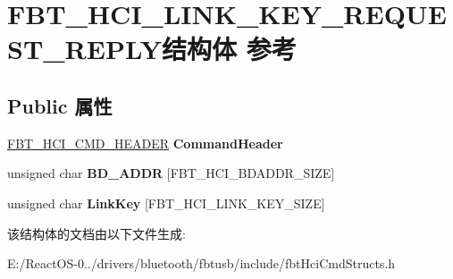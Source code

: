 \hypertarget{struct_f_b_t___h_c_i___l_i_n_k___k_e_y___r_e_q_u_e_s_t___r_e_p_l_y}{}\section{F\+B\+T\+\_\+\+H\+C\+I\+\_\+\+L\+I\+N\+K\+\_\+\+K\+E\+Y\+\_\+\+R\+E\+Q\+U\+E\+S\+T\+\_\+\+R\+E\+P\+L\+Y结构体 参考}
\label{struct_f_b_t___h_c_i___l_i_n_k___k_e_y___r_e_q_u_e_s_t___r_e_p_l_y}
\subsection*{Public 属性}
\begin{DoxyCompactItemize}
\item 
\mbox{\label{struct_f_b_t___h_c_i___l_i_n_k___k_e_y___r_e_q_u_e_s_t___r_e_p_l_y_a4597c1334764703e2ac128514613f824}} 
\hyperlink{struct_f_b_t___h_c_i___c_m_d___h_e_a_d_e_r}{F\+B\+T\+\_\+\+H\+C\+I\+\_\+\+C\+M\+D\+\_\+\+H\+E\+A\+D\+ER} {\bfseries Command\+Header}
\item 
\mbox{\label{struct_f_b_t___h_c_i___l_i_n_k___k_e_y___r_e_q_u_e_s_t___r_e_p_l_y_ae460a31ef35b58efa669abd3abbac3cc}} 
unsigned char {\bfseries B\+D\+\_\+\+A\+D\+DR} \mbox{[}F\+B\+T\+\_\+\+H\+C\+I\+\_\+\+B\+D\+A\+D\+D\+R\+\_\+\+S\+I\+ZE\mbox{]}
\item 
\mbox{\label{struct_f_b_t___h_c_i___l_i_n_k___k_e_y___r_e_q_u_e_s_t___r_e_p_l_y_aab5c51a38e5d3a02c2d22ec25d98a84a}} 
unsigned char {\bfseries Link\+Key} \mbox{[}F\+B\+T\+\_\+\+H\+C\+I\+\_\+\+L\+I\+N\+K\+\_\+\+K\+E\+Y\+\_\+\+S\+I\+ZE\mbox{]}
\end{DoxyCompactItemize}


该结构体的文档由以下文件生成\+:\begin{DoxyCompactItemize}
\item 
E\+:/\+React\+O\+S-\/0../drivers/bluetooth/fbtusb/include/fbt\+Hci\+Cmd\+Structs.\+h\end{DoxyCompactItemize}
